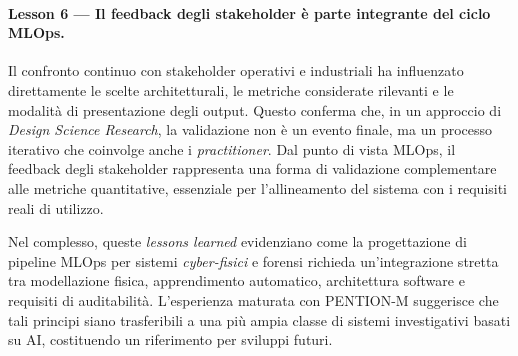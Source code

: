 \paragraph{Lesson 6 — Il feedback degli stakeholder è parte integrante del ciclo MLOps.}
Il confronto continuo con stakeholder operativi e industriali ha influenzato direttamente le scelte architetturali, le metriche considerate rilevanti e le modalità di presentazione degli output.
Questo conferma che, in un approccio di \emph{Design Science Research}, la validazione non è un evento finale, ma un processo iterativo che coinvolge anche i \textit{practitioner}.
Dal punto di vista MLOps, il feedback degli stakeholder rappresenta una forma di validazione complementare alle metriche quantitative, essenziale per l’allineamento del sistema con i requisiti reali di utilizzo.

Nel complesso, queste \emph{lessons learned} evidenziano come la progettazione di pipeline MLOps per sistemi \textit{cyber-fisici} e forensi richieda un’integrazione stretta tra modellazione fisica, apprendimento automatico, architettura software e requisiti di auditabilità.
L’esperienza maturata con \textsc{PENTION-M} suggerisce che tali principi siano trasferibili a una più ampia classe di sistemi investigativi basati su AI, costituendo un riferimento per sviluppi futuri.